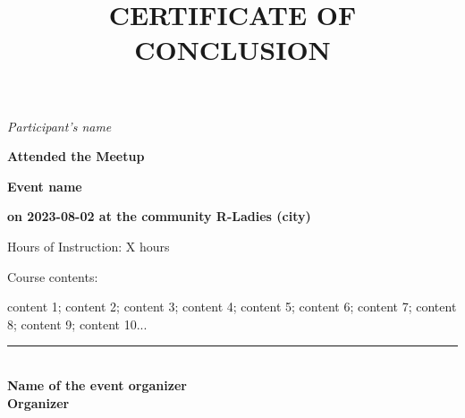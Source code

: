 \documentclass[14pt,landscape]{extarticle}
\title{CERTIFICATE OF CONCLUSION}
\author{}
\date{}
\providecommand{\opensans}{\normalfont}
\begin{document}
\opensans

\maketitle

\begin{center}

\LARGE \textit {
Participant's name
} 

\vspace{1cm}

\normalsize \textbf {
Attended the Meetup 
}

\vspace{0.5cm}

\large \textbf {
Event name 
}


\large \textbf{
on 2023-08-02 at the community R-Ladies (city)
}

\vspace{0.5cm}

\large {
Hours of Instruction: X hours

}

\vspace{0.5cm}

\normalsize {
Course contents:
}

\vspace{0.5cm}

\normalsize 
\begin{varwidth}{0.8\textwidth}

content 1; content 2; content 3; content 4; content 5; content 6; content 7; content 8; content 9; content 10...

\end{varwidth}

\vfill

\vspace{0.5cm}



\rule[0in]{3in}{1pt}\\
\textbf{Name of the event organizer\\
        Organizer}\\
\vspace{0.5cm}

\end{center}
\end{document}
